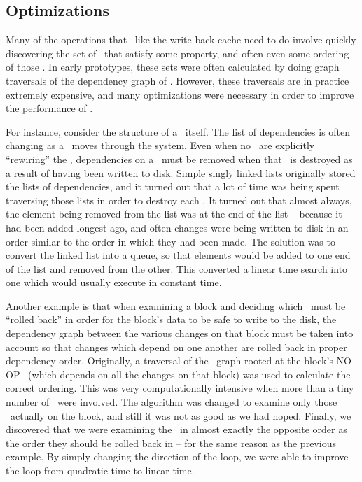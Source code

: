 \subsection {Optimizations}
Many of the operations that \modules\ like the write-back cache need to do
involve quickly discovering the set of \chdescs\ that satisfy some property,
and often even some ordering of those \chdescs. In early prototypes, these sets
were often calculated by doing graph traversals of the dependency graph of
\chdescs. However, these traversals are in practice extremely expensive, and
many optimizations were necessary in order to improve the performance of
\Kudos.

For instance, consider the structure of a \chdesc\ itself. The list of
dependencies is often changing as a \chdesc\ moves through the system. Even
when no \modules\ are explicitly ``rewiring'' the \chdescs, dependencies on a
\chdesc\ must be removed when that \chdesc\ is destroyed as a result of having
been written to disk. Simple singly linked lists originally stored the lists of
dependencies, and it turned out that a lot of time was being spent traversing
those lists in order to destroy each \chdesc. It turned out that almost always,
the element being removed from the list was at the end of the list -- because
it had been added longest ago, and often changes were being written to disk in
an order similar to the order in which they had been made. The solution was to
convert the linked list into a queue, so that elements would be added to one
end of the list and removed from the other. This converted a linear time search
into one which would usually execute in constant time.

Another example is that when examining a block and deciding which \chdescs\
must be ``rolled back'' in order for the block's data to be safe to write to
the disk, the dependency graph between the various changes on that block must
be taken into account so that changes which depend on one another are rolled
back in proper dependency order. Originally, a traversal of the \chdesc\ graph
rooted at the block's NO-OP \chdesc\ (which depends on all the changes on that
block) was used to calculate the correct ordering. This was very
computationally intensive when more than a tiny number of \chdescs\ were
involved. The algorithm was changed to examine only those \chdescs\ actually on
the block, and still it was not as good as we had hoped. Finally, we discovered
that we were examining the \chdescs\ in almost exactly the opposite order as
the order they should be rolled back in -- for the same reason as the previous
example. By simply changing the direction of the loop, we were able to improve
the loop from quadratic time to linear time.

